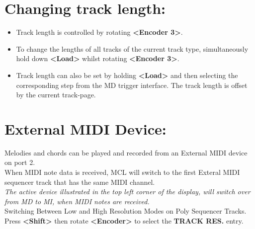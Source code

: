\section{Changing track length:}
\begin{itemize}
\item Track length is controlled by rotating \textbf{<Encoder 3>}.
\item To change the lengths of all tracks of the current track type, simultaneously hold down \textbf{<Load>} whilst rotating \textbf{<Encoder 3>}.
\item Track length can also be set by holding \textbf{<Load>} and then selecting the corresponding step from the MD trigger interface. The track length is offset by the current track-page.
\end{itemize}


\section{External MIDI Device:}
Melodies and chords can be played and recorded from an External MIDI device on port 2.
\\

When MIDI note data is received, MCL will switch to the first Exteral MIDI sequencer track that has the same MIDI channel.
\\

\textit{The active device illustrated in the top left corner of the display, will switch over from MD to MI, when MIDI notes are received.}
\\

Switching Between Low and High Resolution Modes on Poly Sequencer Tracks.
Press \textbf{<Shift>} then rotate \textbf{<Encoder>} to select the \textbf{TRACK RES.} entry.
